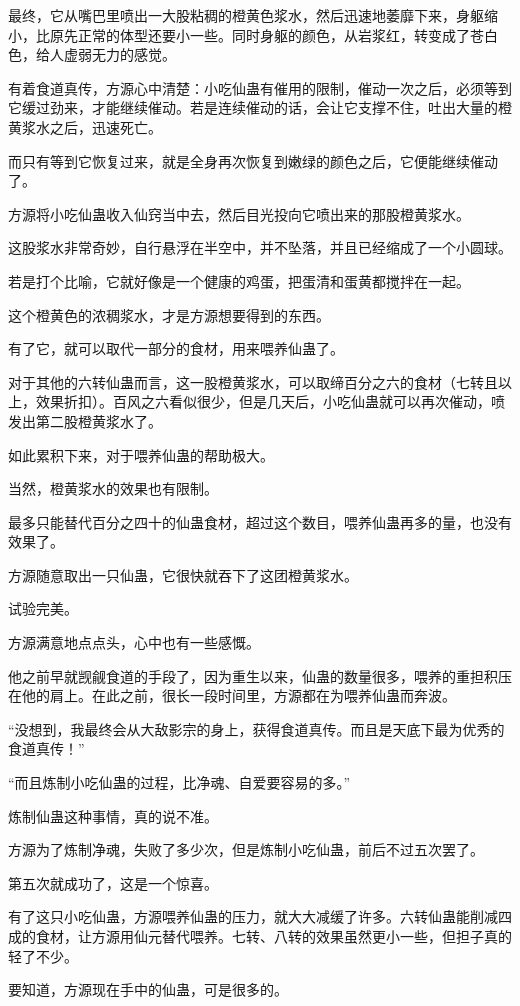 \begin{this_body}
最终，它从嘴巴里喷出一大股粘稠的橙黄色浆水，然后迅速地萎靡下来，身躯缩小，比原先正常的体型还要小一些。同时身躯的颜色，从岩浆红，转变成了苍白色，给人虚弱无力的感觉。

有着食道真传，方源心中清楚：小吃仙蛊有催用的限制，催动一次之后，必须等到它缓过劲来，才能继续催动。若是连续催动的话，会让它支撑不住，吐出大量的橙黄浆水之后，迅速死亡。

而只有等到它恢复过来，就是全身再次恢复到嫩绿的颜色之后，它便能继续催动了。

方源将小吃仙蛊收入仙窍当中去，然后目光投向它喷出来的那股橙黄浆水。

这股浆水非常奇妙，自行悬浮在半空中，并不坠落，并且已经缩成了一个小圆球。

若是打个比喻，它就好像是一个健康的鸡蛋，把蛋清和蛋黄都搅拌在一起。

这个橙黄色的浓稠浆水，才是方源想要得到的东西。

有了它，就可以取代一部分的食材，用来喂养仙蛊了。

对于其他的六转仙蛊而言，这一股橙黄浆水，可以取缔百分之六的食材（七转且以上，效果折扣）。百风之六看似很少，但是几天后，小吃仙蛊就可以再次催动，喷发出第二股橙黄浆水了。

如此累积下来，对于喂养仙蛊的帮助极大。

当然，橙黄浆水的效果也有限制。

最多只能替代百分之四十的仙蛊食材，超过这个数目，喂养仙蛊再多的量，也没有效果了。

方源随意取出一只仙蛊，它很快就吞下了这团橙黄浆水。

试验完美。

方源满意地点点头，心中也有一些感慨。

他之前早就觊觎食道的手段了，因为重生以来，仙蛊的数量很多，喂养的重担积压在他的肩上。在此之前，很长一段时间里，方源都在为喂养仙蛊而奔波。

“没想到，我最终会从大敌影宗的身上，获得食道真传。而且是天底下最为优秀的食道真传！”

“而且炼制小吃仙蛊的过程，比净魂、自爱要容易的多。”

炼制仙蛊这种事情，真的说不准。

方源为了炼制净魂，失败了多少次，但是炼制小吃仙蛊，前后不过五次罢了。

第五次就成功了，这是一个惊喜。

有了这只小吃仙蛊，方源喂养仙蛊的压力，就大大减缓了许多。六转仙蛊能削减四成的食材，让方源用仙元替代喂养。七转、八转的效果虽然更小一些，但担子真的轻了不少。

要知道，方源现在手中的仙蛊，可是很多的。


\end{this_body}
